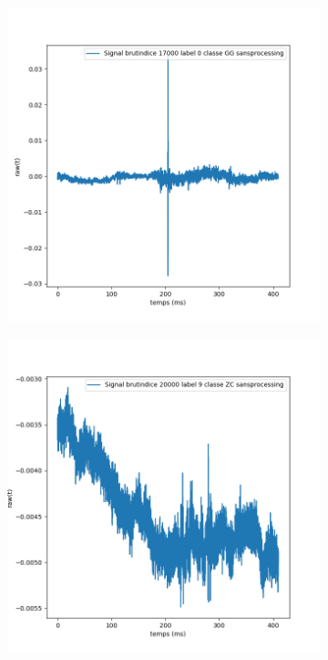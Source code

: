 \begin{figure}[!h]
  \centering
  \begin{subfigure}[b]{0.3\textwidth}
    \includegraphics[width=\textwidth]{./images/indice17000Spectro1Dlabel0classeGGsansprocessingsanszoom.png}
  \end{subfigure}
  \begin{subfigure}[b]{0.3\textwidth}
    \includegraphics[width=\textwidth]{./images/indice20000Spectro1Dlabel9classeZCsansprocessingsanszoom.png}

\end{subfigure}
\end{figure}
